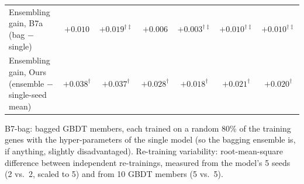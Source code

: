 \begin{table}[t]
{\begin{tabular}{lcccccc}
Ensembling gain, B7a (bag $-$ single) & $+0.010$ & $+0.019^{\dagger\ddagger}$ & $+0.006$ & $+0.003^{\dagger\ddagger}$ & $+0.010^{\dagger\ddagger}$ & $+0.010^{\dagger\ddagger}$ \\
Ensembling gain, Ours (ensemble $-$ single-seed mean) & $+0.038^{\dagger}$ & $+0.037^{\dagger}$ & $+0.028^{\dagger}$ & $+0.018^{\dagger}$ & $+0.021^{\dagger}$ & $+0.020^{\dagger}$ \\
\bottomrule
\end{tabular}}
\par\smallskip\parbox{0.97\linewidth}{\scriptsize B7-bag: bagged GBDT members, each trained on a random 80\% of the training genes with the hyper-parameters of the single model (so the bagging ensemble is, if anything, slightly disadvantaged). Re-training variability: root-mean-square difference between independent re-trainings, measured from the model's 5 seeds (2 vs.\ 2, scaled to 5) and from 10 GBDT members (5 vs.\ 5).}
\end{table}


